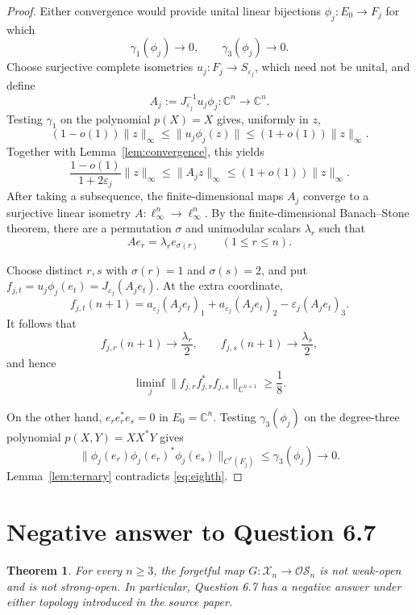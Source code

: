 \documentclass[11pt]{article}
\newtheorem{theorem}{Theorem}
\newcommand{\C}{\mathbb C}
\newcommand{\Xc}{\mathcal X}
\newcommand{\OS}{\mathcal{OS}}
\newcommand{\eps}{\varepsilon}
\begin{document}
\begin{proof}
Either convergence would provide unital linear bijections
$\phi_j:E_0\to F_j$ for which
\[
\gamma_1(\phi_j)\longrightarrow0,
\qquad \gamma_3(\phi_j)\longrightarrow0.
\]
Choose surjective complete isometries $u_j:F_j\to S_{\eps_j}$, which need not
be unital, and define
\[
A_j:=J_{\eps_j}^{-1}u_j\phi_j:\C^n\to\C^n.
\]
Testing $\gamma_1$ on the polynomial $p(X)=X$ gives, uniformly in $z$,
\[
(1-o(1))\|z\|_\infty
\leq\|u_j\phi_j(z)\|
\leq(1+o(1))\|z\|_\infty.
\]
Together with Lemma~\ref{lem:convergence}, this yields
\[
\frac{1-o(1)}{1+2\eps_j}\|z\|_\infty
\leq\|A_jz\|_\infty
\leq(1+o(1))\|z\|_\infty.
\]
After taking a subsequence, the finite-dimensional maps $A_j$ converge to a
surjective linear isometry $A:\ell_\infty^n\to\ell_\infty^n$. By the
finite-dimensional Banach--Stone theorem, there are a permutation $\sigma$
and unimodular scalars $\lambda_r$ such that
\[
Ae_r=\lambda_r e_{\sigma(r)}\qquad(1\leq r\leq n).
\]

Choose distinct $r,s$ with $\sigma(r)=1$ and $\sigma(s)=2$, and put
$f_{j,t}=u_j\phi_j(e_t)=J_{\eps_j}(A_je_t)$. At the extra coordinate,
\[
f_{j,t}(n+1)=a_{\eps_j}(A_je_t)_1
            +a_{\eps_j}(A_je_t)_2
            -\eps_j(A_je_t)_3.
\]
It follows that
\[
f_{j,r}(n+1)\longrightarrow\frac{\lambda_r}{2},
\qquad
f_{j,s}(n+1)\longrightarrow\frac{\lambda_s}{2},
\]
and hence
\begin{equation}\label{eq:eighth}
\liminf_j\|f_{j,r}f_{j,r}^*f_{j,s}\|_{\C^{n+1}}
\geq\frac18.
\end{equation}

On the other hand, $e_re_r^*e_s=0$ in $E_0=\C^n$. Testing
$\gamma_3(\phi_j)$ on the degree-three polynomial
$p(X,Y)=XX^*Y$ gives
\[
\|\phi_j(e_r)\phi_j(e_r)^*\phi_j(e_s)\|_{C^*(F_j)}
\leq\gamma_3(\phi_j)\longrightarrow0.
\]
Lemma~\ref{lem:ternary} contradicts \eqref{eq:eighth}.
\end{proof}

\section{Negative answer to Question 6.7}

\begin{theorem}\label{thm:main}
For every $n\geq3$, the forgetful map
$G:\Xc_n\to\OS_n$ is not weak-open and is not strong-open. In particular,
Question 6.7 has a negative answer under either topology introduced in the
source paper.
\end{theorem}
\end{document}
